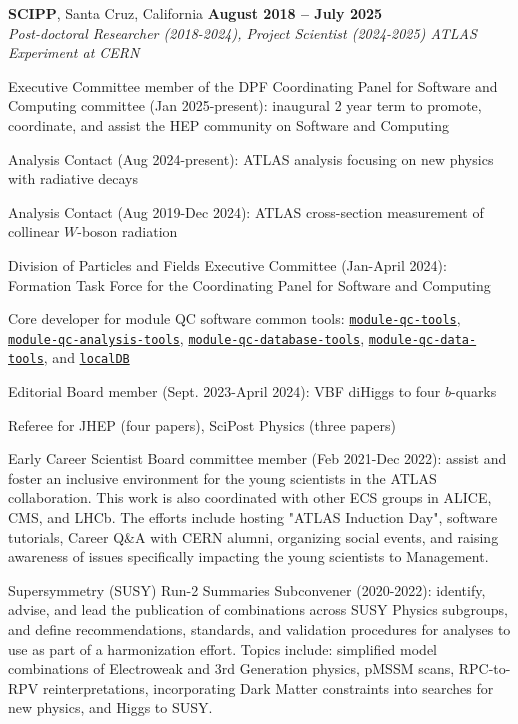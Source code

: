 \documentclass[margin,line]{resume}
\begin{document}
\begin{resume}
\textbf{SCIPP}, Santa Cruz, California \hfill \textbf{August 2018 -- July 2025}\\
\textsl{Post-doctoral Researcher (2018-2024), Project Scientist (2024-2025) ATLAS Experiment at CERN}
\begin{list2}
  \item Executive Committee member of the DPF Coordinating Panel for Software and Computing committee (Jan 2025-present): inaugural 2 year term to promote, coordinate, and assist the HEP community on Software and Computing
  \item Analysis Contact (Aug 2024-present): ATLAS analysis focusing on new physics with radiative decays
  \item Analysis Contact (Aug 2019-Dec 2024): ATLAS cross-section measurement of collinear $W$-boson radiation~\cite{ATLAS:2024mow}
  \item Division of Particles and Fields Executive Committee (Jan-April 2024): Formation Task Force for the Coordinating Panel for Software and Computing
  \item Core developer for module QC software common tools: \href{https://pypi.org/project/module-qc-tools}{\texttt{module-qc-tools}}, \href{https://pypi.org/project/module-qc-analysis-tools}{\texttt{module-qc-analysis-tools}}, \href{https://pypi.org/project/module-qc-database-tools}{\texttt{module-qc-database-tools}}, \href{https://pypi.org/project/module-qc-data-tools}{\texttt{module-qc-data-tools}}, and \href{https://gitlab.cern.ch/YARR/localdb-tools/}{\texttt{localDB}}
  \item Editorial Board member (Sept. 2023-April 2024): VBF diHiggs to four $b$-quarks
  \item Referee for JHEP (four papers), SciPost Physics (three papers)
  \item Early Career Scientist Board committee member (Feb 2021-Dec 2022): assist and foster an inclusive environment for the young scientists in the ATLAS collaboration. This work is also coordinated with other ECS groups in ALICE, CMS, and LHCb. The efforts include hosting "ATLAS Induction Day", software tutorials, Career Q\&A with CERN alumni, organizing social events, and raising awareness of issues specifically impacting the young scientists to Management.
  \item Supersymmetry (SUSY) Run-2 Summaries Subconvener (2020-2022): identify, advise, and lead the publication of combinations across SUSY Physics subgroups, and define recommendations, standards, and validation procedures for analyses to use as part of a harmonization effort. Topics include: simplified model combinations of Electroweak and 3rd Generation physics, pMSSM scans, RPC-to-RPV reinterpretations, incorporating Dark Matter constraints into searches for new physics, and Higgs to SUSY.

\end{list2}
\end{resume}
\end{document}
